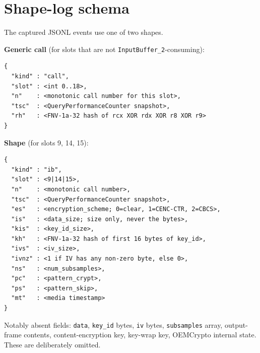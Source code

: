 \documentclass[11pt,letterpaper]{article}
\begin{document}
\section{Shape-log schema}
\label{app:schema}

The captured JSONL events use one of two shapes.

\textbf{Generic call} (for slots that are not
\texttt{InputBuffer\_2}-consuming):
\begin{lstlisting}[basicstyle=\ttfamily\footnotesize]
{
  "kind" : "call",
  "slot" : <int 0..18>,
  "n"    : <monotonic call number for this slot>,
  "tsc"  : <QueryPerformanceCounter snapshot>,
  "rh"   : <FNV-1a-32 hash of rcx XOR rdx XOR r8 XOR r9>
}
\end{lstlisting}

\textbf{Shape} (for slots 9, 14, 15):
\begin{lstlisting}[basicstyle=\ttfamily\footnotesize]
{
  "kind" : "ib",
  "slot" : <9|14|15>,
  "n"    : <monotonic call number>,
  "tsc"  : <QueryPerformanceCounter snapshot>,
  "es"   : <encryption_scheme; 0=clear, 1=CENC-CTR, 2=CBCS>,
  "is"   : <data_size; size only, never the bytes>,
  "kis"  : <key_id_size>,
  "kh"   : <FNV-1a-32 hash of first 16 bytes of key_id>,
  "ivs"  : <iv_size>,
  "ivnz" : <1 if IV has any non-zero byte, else 0>,
  "ns"   : <num_subsamples>,
  "pc"   : <pattern_crypt>,
  "ps"   : <pattern_skip>,
  "mt"   : <media timestamp>
}
\end{lstlisting}

Notably absent fields:
\texttt{data}, \texttt{key\_id} bytes, \texttt{iv} bytes,
\texttt{subsamples} array, output-frame contents,
content-encryption key, key-wrap key, OEMCrypto internal state.
These are deliberately omitted.
\end{document}
